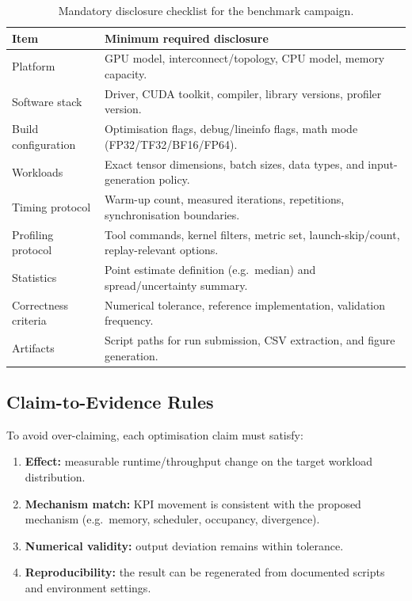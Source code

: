 \begin{table}[H]
  \centering
  \small
  \begin{tabularx}{\textwidth}{l X}
    \toprule
    Item & Minimum required disclosure \\
    \midrule
    Platform & GPU model, interconnect/topology, CPU model, memory capacity. \\
    Software stack & Driver, CUDA toolkit, compiler, library versions, profiler version. \\
    Build configuration & Optimisation flags, debug/lineinfo flags, math mode (FP32/TF32/BF16/FP64). \\
    Workloads & Exact tensor dimensions, batch sizes, data types, and input-generation policy. \\
    Timing protocol & Warm-up count, measured iterations, repetitions, synchronisation boundaries. \\
    Profiling protocol & Tool commands, kernel filters, metric set, launch-skip/count, replay-relevant options. \\
    Statistics & Point estimate definition (e.g.\ median) and spread/uncertainty summary. \\
    Correctness criteria & Numerical tolerance, reference implementation, validation frequency. \\
    Artifacts & Script paths for run submission, CSV extraction, and figure generation. \\
    \bottomrule
  \end{tabularx}
  \caption{Mandatory disclosure checklist for the benchmark campaign.}
  \label{tab:methodology-reporting-checklist}
\end{table}

\subsection{Claim-to-Evidence Rules}

To avoid over-claiming, each optimisation claim must satisfy:
\begin{enumerate}
  \item \textbf{Effect:} measurable runtime/throughput change on the target
  workload distribution.
  \item \textbf{Mechanism match:} KPI movement is consistent with the proposed
  mechanism (e.g.\ memory, scheduler, occupancy, divergence).
  \item \textbf{Numerical validity:} output deviation remains within tolerance.
  \item \textbf{Reproducibility:} the result can be regenerated from documented
  scripts and environment settings.
\end{enumerate}

